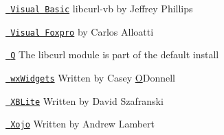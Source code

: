 \href{https://sourceforge.net/projects/libcurl-vb/}{\texttt{ Visual Basic}} libcurl-\/vb by Jeffrey Phillips

\href{https://web.archive.org/web/20130730181523/www.ctl32.com.ar/libcurl.asp}{\texttt{ Visual Foxpro}} by Carlos Alloatti

\href{https://q-lang.sourceforge.io/}{\texttt{ Q}} The libcurl module is part of the default install

\href{https://wxcode.sourceforge.io/components/wxcurl/}{\texttt{ wx\+Widgets}} Written by Casey \mbox{\hyperlink{class_o}{O}}\textquotesingle{}Donnell

\href{https://web.archive.org/web/20060426150418/perso.wanadoo.fr/xblite/libraries.html}{\texttt{ XBLite}} Written by David Szafranski

\href{https://github.com/charonn0/RB-libcURL}{\texttt{ Xojo}} Written by Andrew Lambert 